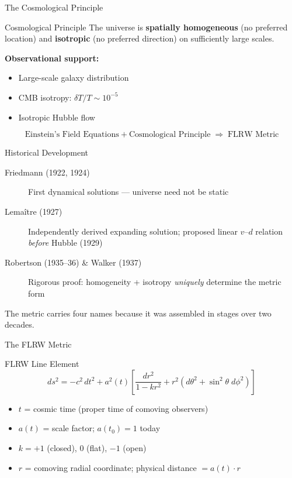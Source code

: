 \documentclass[aspectratio=169,11pt]{beamer}
\begin{document}
\begin{frame}{The Cosmological Principle}
\begin{block}{Cosmological Principle}
The universe is \textbf{spatially homogeneous} (no preferred location) and \textbf{isotropic} (no preferred direction) on sufficiently large scales.
\end{block}
\vspace{0.3cm}
\textbf{Observational support:}
\begin{itemize}
    \item Large-scale galaxy distribution
    \item CMB isotropy: $\delta T/T \sim 10^{-5}$
    \item Isotropic Hubble flow
\end{itemize}
\vspace{0.3cm}
\begin{equation*}
    \text{Einstein's Field Equations} + \text{Cosmological Principle}
    \;\Longrightarrow\; \text{FLRW Metric}
\end{equation*}
\end{frame}

\begin{frame}{Historical Development}
\begin{description}
    \item[Friedmann (1922, 1924)] First dynamical solutions --- universe need not be static
    \item[Lema\^{i}tre (1927)] Independently derived expanding solution; proposed linear $v$--$d$ relation \emph{before} Hubble (1929)
    \item[Robertson (1935--36) \& Walker (1937)] Rigorous proof: homogeneity + isotropy \emph{uniquely} determine the metric form
\end{description}
\vfill
\small The metric carries four names because it was assembled in stages over two decades.
\end{frame}

\begin{frame}{The FLRW Metric}
\begin{alertblock}{FLRW Line Element}
\begin{equation*}
    ds^{2} = -c^{2}\,dt^{2}
    + a^{2}(t)\!\left[\frac{dr^{2}}{1-kr^{2}}
    + r^{2}\!\left(d\theta^{2} + \sin^{2}\!\theta\;d\phi^{2}\right)\right]
\end{equation*}
\end{alertblock}
\begin{itemize}
    \item $t$ = cosmic time (proper time of comoving observers)
    \item $a(t)$ = scale factor; $a(t_0)=1$ today
    \item $k=+1$ (closed), $0$ (flat), $-1$ (open)
    \item $r$ = comoving radial coordinate; physical distance $= a(t)\cdot r$
\end{itemize}
\end{frame}
\end{document}
